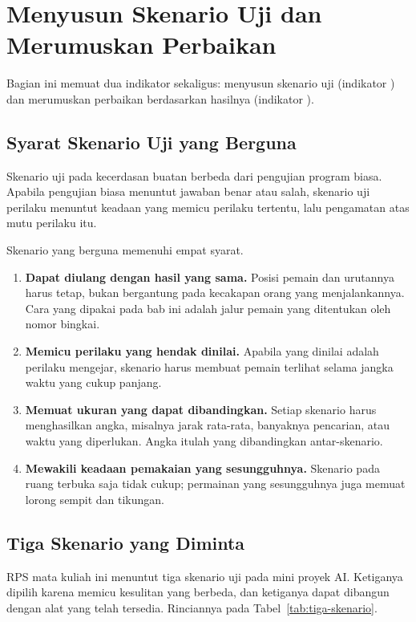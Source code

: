 \section{Menyusun Skenario Uji dan Merumuskan Perbaikan}
\label{sec:skenario-perbaikan}

Bagian ini memuat dua indikator sekaligus: menyusun skenario uji
(indikator ) dan merumuskan perbaikan berdasarkan hasilnya
(indikator ).

\subsection{Syarat Skenario Uji yang Berguna}

Skenario uji pada kecerdasan buatan berbeda dari pengujian program biasa.
Apabila pengujian biasa menuntut jawaban benar atau salah, skenario uji
perilaku menuntut keadaan yang memicu perilaku tertentu, lalu pengamatan atas
mutu perilaku itu.

Skenario yang berguna memenuhi empat syarat.

\begin{enumerate}
  \item \textbf{Dapat diulang dengan hasil yang sama.} Posisi pemain dan
        urutannya harus tetap, bukan bergantung pada kecakapan orang yang
        menjalankannya. Cara yang dipakai pada bab ini adalah jalur pemain yang
        ditentukan oleh nomor bingkai.
  \item \textbf{Memicu perilaku yang hendak dinilai.} Apabila yang dinilai
        adalah perilaku mengejar, skenario harus membuat pemain terlihat
        selama jangka waktu yang cukup panjang.
  \item \textbf{Memuat ukuran yang dapat dibandingkan.} Setiap skenario harus
        menghasilkan angka, misalnya jarak rata-rata, banyaknya pencarian, atau
        waktu yang diperlukan. Angka itulah yang dibandingkan antar-skenario.
  \item \textbf{Mewakili keadaan pemakaian yang sesungguhnya.} Skenario pada
        ruang terbuka saja tidak cukup; permainan yang sesungguhnya juga memuat
        lorong sempit dan tikungan.
\end{enumerate}

\subsection{Tiga Skenario yang Diminta}

RPS mata kuliah ini menuntut tiga skenario uji pada mini proyek AI. Ketiganya
dipilih karena memicu kesulitan yang berbeda, dan ketiganya dapat dibangun
dengan alat yang telah tersedia. Rinciannya pada
Tabel~\ref{tab:tiga-skenario}.

